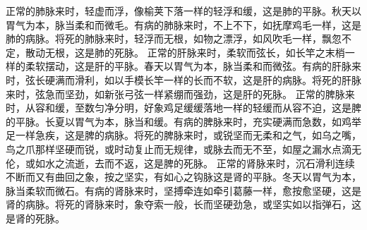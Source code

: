 \documentclass[a4paper,12pt,UTF8,twoside]{ctexbook}
\begin{document}
正常的肺脉来时，轻虚而浮，像榆荚下落一样的轻浮和缓，这是肺的平脉。秋天以胃气为本，脉当柔和而微毛。有病的肺脉来时，不上不下，如抚摩鸡毛一样，这是肺的病脉。将死的肺脉来时，轻浮而无根，如物之漂浮，如风吹毛一样，飘忽不定，散动无根，这是肺的死脉。
正常的肝脉来时，柔软而弦长，如长竿之末梢一样的柔软摆动，这是肝的平脉。春天以胃气为本，脉当柔和而微弦。有病的肝脉来时，弦长硬满而滑利，如以手模长竿一样的长而不软，这是肝的病脉。将死的肝脉来时，弦急而坚劲，如新张弓弦一样紧绷而强劲，这是肝的死脉。
正常的脾脉来时，从容和缓，至数匀净分明，好象鸡足缓缓落地一样的轻缓而从容不迫，这是脾的平脉。长夏以胃气为本，脉当和缓。有病的脾脉来时，充实硬满而急数，如鸡举足一样急疾，这是脾的病脉。将死的脾脉来时，或锐坚而无柔和之气，如乌之嘴，鸟之爪那样坚硬而锐，或时动复止而无规律，或脉去而无不至，如屋之漏水点滴无伦，或如水之流逝，去而不返，这是脾的死脉。
正常的肾脉来时，沉石滑利连续不断而又有曲回之象，按之坚实，有如心之钩脉这是肾的平脉。冬天以胃气为本，脉当柔软而微石。有病的肾脉来时，坚搏牵连如牵引葛藤一样，愈按愈坚硬，这是肾的病脉。将死的肾脉来时，象夺索一般，长而坚硬劲急，或坚实如以指弹石，这是肾的死脉。

\part{}
\end{document}
